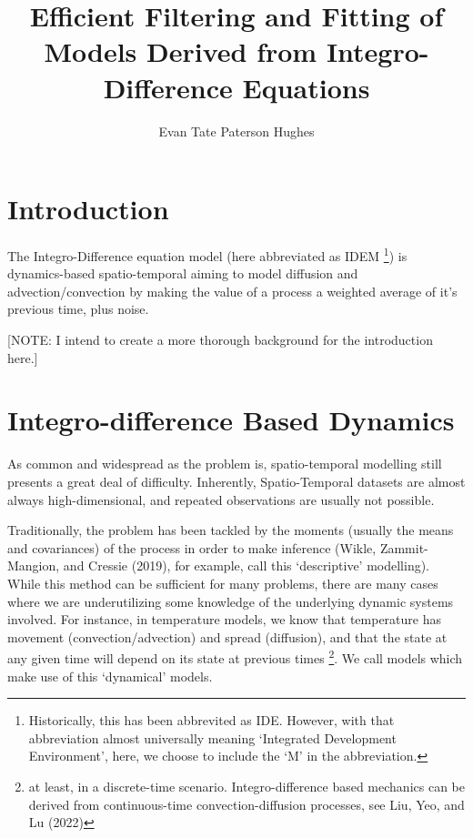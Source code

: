 \documentclass[
]{report}
\title{Efficient Filtering and Fitting of Models Derived from
Integro-Difference Equations}
\author{Evan Tate Paterson Hughes}
\date{}
\renewcommand*\contentsname{Table of contents}
\newcommand\contentsname{Table of contents}
\theoremstyle{plain}
\theoremstyle{plain}
\theoremstyle{plain}
\theoremstyle{remark}
\begin{document}
\maketitle

\renewcommand*\contentsname{Table of contents}
{
\hypersetup{linkcolor=}
\setcounter{tocdepth}{2}
\tableofcontents
}

\chapter{Introduction}\label{introduction}

The Integro-Difference equation model (here abbreviated as IDEM
\footnote{Historically, this has been abbrevited as IDE. However, with
  that abbreviation almost universally meaning `Integrated Development
  Environment', here, we choose to include the `M' in the abbreviation.})
is dynamics-based spatio-temporal aiming to model diffusion and
advection/convection by making the value of a process a weighted average
of it's previous time, plus noise.

{{[}NOTE: I intend to create a more thorough background for the
introduction here.{]}}

\chapter{Integro-difference Based
Dynamics}\label{integro-difference-based-dynamics}

As common and widespread as the problem is, spatio-temporal modelling
still presents a great deal of difficulty. Inherently, Spatio-Temporal
datasets are almost always high-dimensional, and repeated observations
are usually not possible.

Traditionally, the problem has been tackled by the moments (usually the
means and covariances) of the process in order to make inference (Wikle,
Zammit-Mangion, and Cressie (2019), for example, call this `descriptive'
modelling). While this method can be sufficient for many problems, there
are many cases where we are underutilizing some knowledge of the
underlying dynamic systems involved. For instance, in temperature
models, we know that temperature has movement (convection/advection) and
spread (diffusion), and that the state at any given time will depend on
its state at previous times \footnote{at least, in a discrete-time
  scenario. Integro-difference based mechanics can be derived from
  continuous-time convection-diffusion processes, see Liu, Yeo, and Lu
  (2022)}. We call models which make use of this `dynamical' models.
\end{document}
